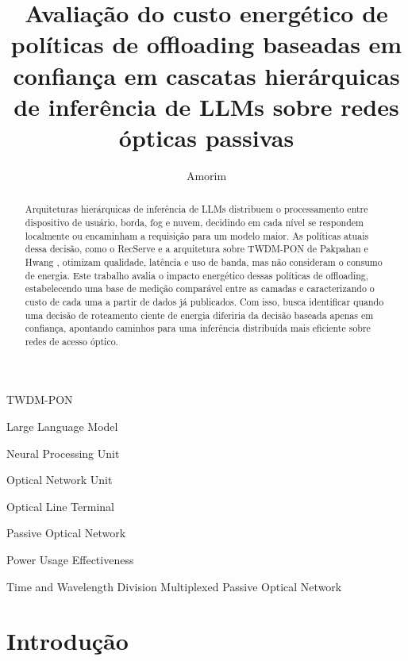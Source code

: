 \documentclass[cic,dipl]{infufrgs}
\title{Avalia\c{c}\~ao do custo energ\'etico de pol\'iticas de offloading
  baseadas em confian\c{c}a em cascatas hier\'arquicas de infer\^encia de
  LLMs sobre redes \'opticas passivas}
\author{Amorim}{Diego Hommerding}
\begin{document}

\maketitle

\begin{abstract}
Arquiteturas hier\'arquicas de infer\^encia de LLMs distribuem o
processamento entre dispositivo de usu\'ario, borda, fog e nuvem, decidindo
em cada n\'ivel se respondem localmente ou encaminham a requisi\c{c}\~ao
para um modelo maior. As pol\'iticas atuais dessa decis\~ao, como o
RecServe \cite{wu2025recserve} e a arquitetura sobre TWDM-PON de Pakpahan e
Hwang \cite{pakpahan2026continuum}, otimizam qualidade, lat\^encia e uso de
banda, mas n\~ao consideram o consumo de energia. Este trabalho avalia o
impacto energ\'etico dessas pol\'iticas de offloading, estabelecendo uma
base de medi\c{c}\~ao compar\'avel entre as camadas e caracterizando o
custo de cada uma a partir de dados j\'a publicados. Com isso, busca
identificar quando uma decis\~ao de roteamento ciente de energia
diferiria da decis\~ao baseada apenas em confian\c{c}a, apontando
caminhos para uma infer\^encia distribu\'ida mais eficiente sobre redes
de acesso \'optico.
\end{abstract}

\tableofcontents

\listoffigures

\listoftables

\begin{listofabbrv}{TWDM-PON}
  \item[LLM]  Large Language Model
  \item[NPU]  Neural Processing Unit
  \item[ONU]  Optical Network Unit
  \item[OLT]  Optical Line Terminal
  \item[PON]  Passive Optical Network
  \item[PUE]  Power Usage Effectiveness
  \item[TWDM-PON] Time and Wavelength Division Multiplexed Passive Optical Network
\end{listofabbrv}

\chapter{Introdu\c{c}\~ao}
\label{cap:introducao}
\end{document}

